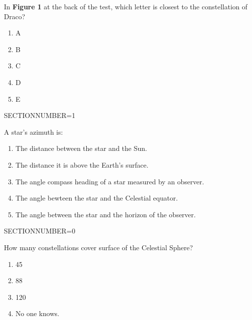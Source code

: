 \documentclass[11pt]{article}
\begin{document}
\begin{enumerate}
\begin{minipage}{\textwidth}
\begin{minipage}{\textwidth}
\item In {\bf Figure 1} at the back of the test, which letter is closest to the constellation of Draco?
\begin{multicols}{3}
\begin{enumerate} 
\setlength{\itemsep}{1pt} 
\setlength{\parskip}{0pt} 
\setlength{\parsep}{0pt}
\setlength{\multicolsep}{1pt} 
\item A
\item B
\item C
\item D
\item E
\end{enumerate} 
\vfill 
\end{multicols}

\end{minipage}
SECTIONNUMBER=1
\end{minipage}
\vskip 0.20in

\begin{minipage}{\textwidth}
\begin{minipage}{\textwidth}
\item A star's azimuth is:
\begin{enumerate} 
\setlength{\itemsep}{1pt} 
\setlength{\parskip}{0pt} 
\setlength{\parsep}{0pt}
\setlength{\multicolsep}{1pt} 
\item The distance between the star and the Sun.
\item The distance it is above the Earth's surface.
\item The angle compass heading of a star measured by an observer.
\item The angle bewteen the star and the Celestial equator.
\item The angle between the star and the horizon of the observer.
\end{enumerate} 
\end{minipage}
SECTIONNUMBER=0
\end{minipage}
\vskip 0.20in

\begin{minipage}{\textwidth}
\begin{minipage}{\textwidth}
\item How many constellations cover surface of the Celestial Sphere?
\begin{multicols}{3}
\begin{enumerate} 
\setlength{\itemsep}{1pt} 
\setlength{\parskip}{0pt} 
\setlength{\parsep}{0pt}
\setlength{\multicolsep}{1pt} 
\item 45
\item 88
\item 120
\item No one knows.
\end{enumerate} 
\vfill 
\end{multicols}


\end{minipage}
\end{minipage}
\end{enumerate}
\end{document}
